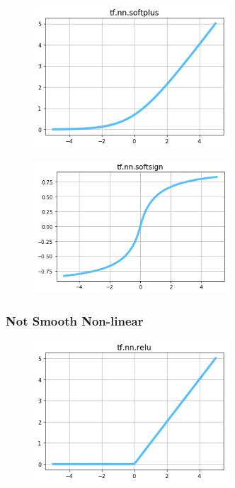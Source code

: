 \begin{figure}
\centering
\includegraphics[width=0.65\textwidth]{./sync_imgs/act/smooth/softplus.png}
\label{fig:act_smooth_softplus}
\end{figure}

\begin{figure}
\centering
\includegraphics[width=0.65\textwidth]{./sync_imgs/act/smooth/softsign.png}
\label{fig:act_smooth_softsign}
\end{figure}


\subsubsection{Not Smooth Non-linear}

\begin{figure}
\centering
\includegraphics[width=0.65\textwidth]{./sync_imgs/act/notsmooth/relu.png}
\label{fig:act_notsmooth_relu}
\end{figure}

